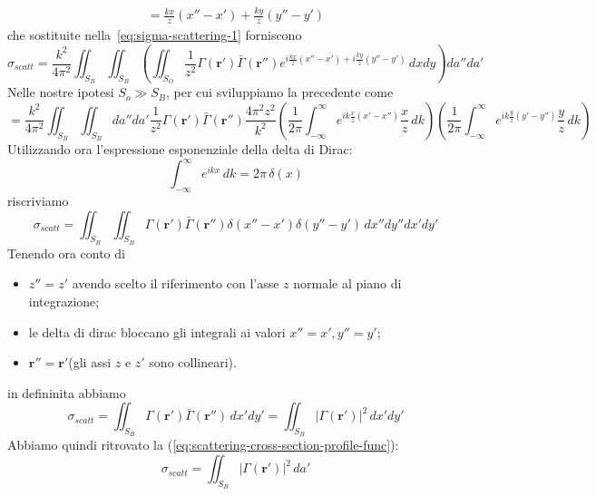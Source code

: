 \begin{fullwidth}
\begin{gather}
    = \frac{kx}{z}(x''-x') +\frac{ky}{z}(y''-y')
    \end{gather}
    che sostituite nella~\ref{eq:sigma-scattering-1} forniscono
    \[
    \sigma_{scatt} = \frac{k^{2}}{4 \pi^{2}} \iint_{S_{B}}\iint_{S_{B}} \left( \iint_{S_{O}} \frac{1}{z^{2}} \Gamma(\bm{r}')\bar{\Gamma}(\bm{r}'') e^{ i \frac{kx}{z}(x''-x') + i \frac{ky}{z} (y'' - y')} \, dxdy\right) da''da'
    \]
    Nelle nostre ipotesi $S_{o} \gg S_{B}$, per cui sviluppiamo la precedente come
    \[
     = \frac{k^{2}}{4 \pi^{2}} \iint_{S_{B}}\iint_{S_{B}} da'' da'\frac{1}{z^{2}} \Gamma(\bm{r}') \bar{\Gamma}(\bm{r}'') \frac{4 \pi^{2}z^{2}}{k^{2}}\left( \frac{1}{2 \pi} \int_{-\infty}^{\infty} e^{ ik \frac{x}{z}(x'-x'') } \frac{x}{z} \, dk  \right)\left( \frac{1}{2 \pi} \int_{-\infty}^{\infty} e^{ ik \frac{y}{z}(y'-y'') } \frac{y}{z} \, dk  \right)
    \]
    Utilizzando ora l'espressione esponenziale della delta di Dirac:
    \[
    \int_{-\infty}^{\infty} e^{ ikx } \, dk = 2 \pi \, \delta(x)
    \]
    riscriviamo
    \[
    \sigma_{scatt} = \iint_{S_{B}}\iint_{S_{B}} \Gamma(\bm{r}') \bar{\Gamma}(\bm{r}'') \delta(x''-x')\delta(y''-y') \,dx''dy''dx'dy'
    \]
    Tenendo ora conto di
    \begin{itemize}
        \item $z'' = z'$ avendo scelto il riferimento con l'asse $z$ normale al piano di integrazione;
        \item le delta di dirac bloccano gli integrali ai valori $x''=x',y''=y'$;
        \item $\bm{r}''=\bm{r}'$(gli assi $z$ e $z'$ sono collineari).
    \end{itemize}
    in defininita abbiamo
    \[
    \sigma_{scatt} = \iint_{S_{B}}  \Gamma(\bm{r}') \bar{\Gamma}(\bm{r}'') \, dx'dy'= \iint_{S_{B}} |\Gamma(\bm{r}')|^{2} \, dx'dy'
    \]
    Abbiamo quindi ritrovato la (\ref{eq:scattering-cross-section-profile-func}):
    \[
    \sigma_{scatt} = \iint_{S_{B}}  |\Gamma(\bm{r}')|^{2} \, da'
    \]








\end{fullwidth}
